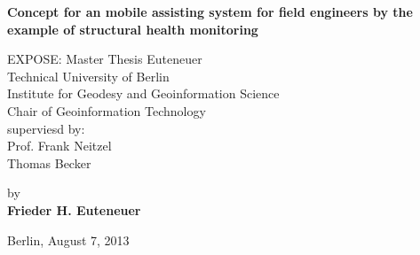 \begin{center}
\vspace*{\fill}

    {\Large{\bf Concept for an mobile assisting system for field engineers by the example of structural health monitoring}} \vspace{0.5cm}


    {\normalsize EXPOSE: Master Thesis Euteneuer}\\\vspace{0.5cm}
    {\normalsize Technical University of Berlin \\
    Institute for Geodesy and Geoinformation Science \\
	Chair of Geoinformation Technology\\
	superviesd by:\\	
	Prof. Frank Neitzel\\
	Thomas Becker}\vspace{1cm}

    {\normalsize by \\\vspace{0.5cm}
    {\bf Frieder H. Euteneuer}} \vspace{1cm}
		

    {\normalsize Berlin, August 7, 2013}
\vfill
\end{center}
